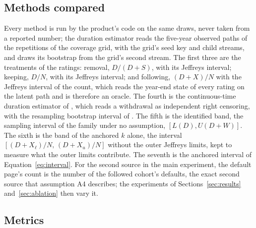 \subsection{Methods compared}

Every method is run by the product's code on the same draws, never taken from a reported number; the duration estimator reads the five-year observed paths of the repetitions of the coverage grid, with the grid's seed key and child streams, and draws its bootstrap from the grid's second stream. The first three are the treatments of the \wdn{} ratings: removal, $D/(D+S)$, with its Jeffreys interval; keeping, $D/N$, with its Jeffreys interval; and following, $(D+X)/N$ with the Jeffreys interval of the count, which reads the year-end state of every \wdn{} rating on the latent path and is therefore an oracle. The fourth is the continuous-time duration estimator of \citet{lando2002}, which reads a withdrawal as independent right censoring, with the resampling bootstrap interval of \citet{schuermann2004}. The fifth is the identified band, the sampling interval of the family under no assumption, $[L(D),U(D+W)]$. The sixth is the band of the anchored $k$ alone, the interval $[(D+X_{\ell})/N,\,(D+X_{u})/N]$ without the outer Jeffreys limits, kept to measure what the outer limits contribute. The seventh is the anchored interval of Equation~\eqref{eq:interval}. For the second source in the main experiment, the default page's count is the number of the followed cohort's defaults, the exact second source that assumption A4 describes; the experiments of Sections~\ref{sec:results} and~\ref{sec:ablation} then vary it.

\subsection{Metrics}

